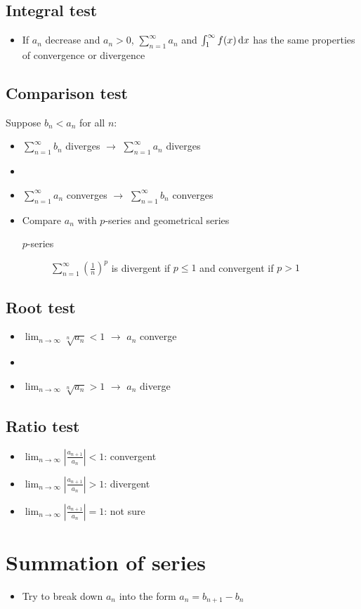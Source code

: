 \subsection{Integral test}
\begin{itemize}
    \item If $a_n$ decrease and $a_n>0$, $\sum_{n=1}^{\infty}a_n$ and $\int_{1}^{\infty} f(x) \operatorname{\mathrm{d}\mathit{x}}$
    has the same properties of convergence or divergence
\end{itemize}

\subsection{Comparison test}
Suppose $b_n<a_n$ for all $n$:
\begin{itemize}
    \item $\sum_{n=1}^{\infty}b_n$ diverges $\rightarrow$ $\sum_{n=1}^{\infty}a_n$ diverges
    \item \item $\sum_{n=1}^{\infty}a_n$ converges $\rightarrow$ $\sum_{n=1}^{\infty}b_n$ converges
    \item Compare $a_n$ with $p$-series and geometrical series
    \begin{description}
        \item[$p$-series] $\sum_{n=1}^{\infty} \left(\frac{1}{n}\right)^p$ is divergent if $p\leq 1$ and 
        convergent if $p>1$
    \end{description}
\end{itemize}

\subsection{Root test}
\begin{itemize}
    \item $\lim_{n\rightarrow\infty}\sqrt[n]{a_n} < 1$ $\rightarrow$ $a_n$ converge
    \item \item $\lim_{n\rightarrow\infty}\sqrt[n]{a_n} > 1$ $\rightarrow$ $a_n$ diverge
\end{itemize}

\subsection{Ratio test}
\begin{itemize}
    \item $\lim_{n\rightarrow\infty} \left|\frac{a_{n+1}}{a_n}\right| < 1$: convergent
    \item $\lim_{n\rightarrow\infty} \left|\frac{a_{n+1}}{a_n}\right| > 1$: divergent
    \item $\lim_{n\rightarrow\infty} \left|\frac{a_{n+1}}{a_n}\right| = 1$: not sure
\end{itemize}

\section{Summation of series}
\begin{itemize}
    \item Try to break down $a_n$ into the form $a_n=b_{n+1}-b_n$
\end{itemize}